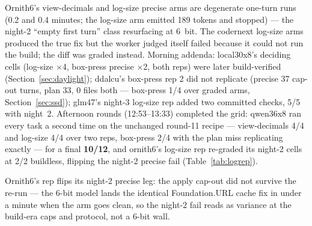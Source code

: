 \begin{table}[htbp]
\smallskip\footnotesize
Ornith6's view-decimals and log-size precise arms are degenerate one-turn runs (0.2 and 0.4 minutes; the
log-size arm emitted 189 tokens and stopped) --- the night-2 ``empty first turn'' class resurfacing at 6~bit.
The codernext log-size arms produced the true fix but the worker judged itself failed because it could not run
the build; the diff was graded instead. Morning addenda: local30x8's deciding cells (log-size $\times$4,
box-press precise $\times$2, both reps) were later build-verified (Section~\ref{sec:daylight}); ddalcu's
box-press rep 2 did not replicate (precise 37 cap-out turns, plan 33, 0 files both --- box-press 1/4 over
graded arms, Section~\ref{sec:ssd}); glm47's night-3 log-size rep added two committed checks, 5/5 with
night~2. Afternoon rounds (12:53--13:33) completed the grid: qwen36x8 ran every task a second time on the
unchanged round-11 recipe --- view-decimals 4/4 and log-size 4/4 over two reps, box-press 2/4 with the plan
miss replicating exactly --- for a final \textbf{10/12}, and ornith6's log-size rep re-graded its night-2
cells at 2/2 buildless, flipping the night-2 precise fail (Table~\ref{tab:logrep}).
\end{table}

\begin{table}[htbp]
\centering
\small
\caption{The completed log-size replication grid: earlier record against the buildless rep 2 of rounds
12--13, diffs inspected, one server up at a time, verify-up gate before each. With the box-press rep 2 of
round 14 (13:33), every candidate$\times$task cell of the night is run twice or structurally settled ---
every task now has two reps; qwen36x8 closes at 10 of 12.}\label{tab:logrep}

\smallskip\footnotesize
Ornith6's rep flips its night-2 precise leg: the apply cap-out did not survive the re-run --- the 6-bit model
lands the identical Foundation.URL cache fix in under a minute when the arm goes clean, so the night-2 fail
reads as variance at the build-era caps and protocol, not a 6-bit wall.
\end{table}

